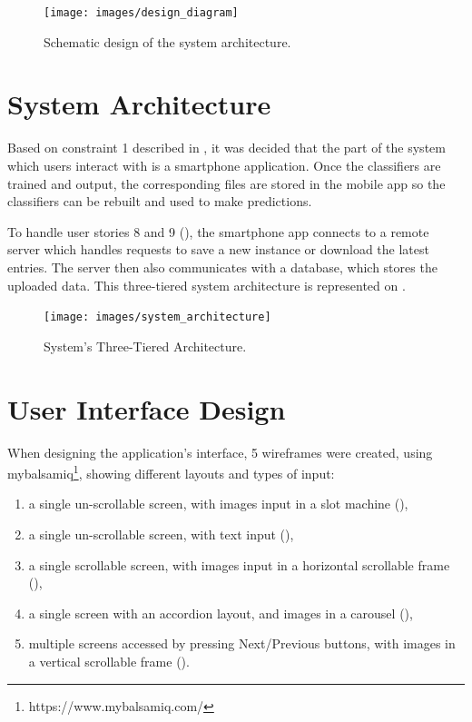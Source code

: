 \documentclass{mproj}
\begin{document}
\begin{figure}[h]
	\centering
	\texttt{[image: images/design\_diagram]}
	\caption{Schematic design of the system architecture.}
	\label{fig:design}
\end{figure}

\section{System Architecture}

Based on constraint 1 described in , it was decided that the part of the system which users interact with is a smartphone application. Once the classifiers are trained and output, the corresponding files are stored in the mobile app so the classifiers can be rebuilt and used to make predictions.\par

To handle user stories 8 and 9 (), the smartphone app connects to a remote server which handles requests to save a new instance or download the latest entries. The server then also communicates with a database, which stores the uploaded data. This three-tiered system architecture is represented on .

\begin{figure}[h]
	\centering
	\texttt{[image: images/system\_architecture]}
	\caption{System's Three-Tiered Architecture.}
	\label{fig:architecture}
\end{figure}

\section{User Interface Design}\label{wireframes}

When designing the application's interface, 5 wireframes were created, using mybalsamiq\footnote{https://www.mybalsamiq.com/}, showing different layouts and types of input:
\begin{enumerate}[label=\Alph*.,topsep=0pt]
	\item a single un-scrollable screen, with images input in a slot machine (),
	\item a single un-scrollable screen, with text input (),
	\item a single scrollable screen, with images input in a horizontal scrollable frame (),
	\item a single screen with an accordion layout, and images in a carousel (),
	\item multiple screens accessed by pressing Next/Previous buttons, with images in a vertical scrollable frame ().
\end{enumerate}
	
\end{document}
